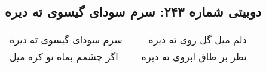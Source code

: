 \begin{center}
\section*{دوبیتی شماره ۲۴۳: سرم سودای گیسوی ته دیره}
\label{sec:243}
\begin{longtable}{l p{0.5cm} r}
سرم سودای گیسوی ته دیره
&&
دلم میل گل روی ته دیره
\\
اگر چشمم بماه نو کره میل
&&
نظر بر طاق ابروی ته دیره
\\
\end{longtable}
\end{center}
